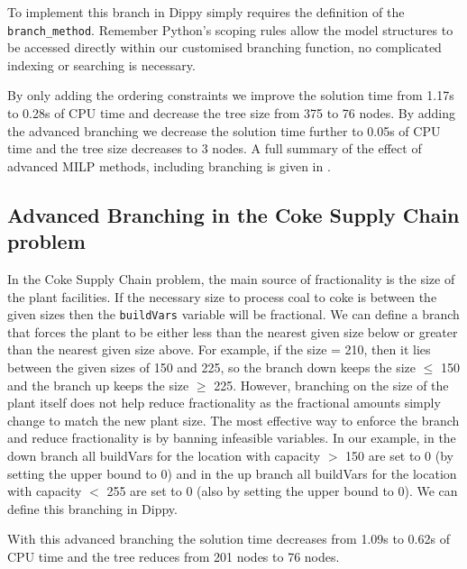 To implement this branch in Dippy simply requires the definition of the \\ \texttt{branch\_method}. Remember Python's scoping rules allow the model structures to be accessed directly within our customised branching function, no complicated indexing or searching is necessary.


By only adding the ordering constraints we improve the solution time from 1.17s to 0.28s of CPU time and decrease the tree size from 375 to 76 nodes. By adding the advanced branching we decrease the solution time further to 0.05s of CPU time and the tree size decreases to 3 nodes. A full summary of the effect of advanced \ac{MILP} methods, including branching is given in .

\subsection{Advanced Branching in the Coke Supply Chain problem}

In the Coke Supply Chain problem, the main source of fractionality is the size of the plant facilities. If the necessary size to process coal to coke is between the given sizes then the \texttt{buildVars} variable will be fractional. We can define a branch that forces the plant to be either less than the nearest given size below or greater than the nearest given size above. For example, if the size = 210, then it lies between the given sizes of 150 and 225, so the branch down keeps the size $\leq$ 150 and the branch up keeps the size $\geq$ 225. However, branching on the size of the plant itself does not help reduce fractionality as the fractional amounts simply change to match the new plant size. The most effective way to enforce the branch and reduce fractionality is by banning infeasible variables. In our example, in the down branch all buildVars for the location with capacity $>$ 150 are set to 0 (by setting the upper bound to 0) and in the up branch all buildVars for the location with capacity $<$ 255 are set to 0 (also by setting the upper bound to 0). We can define this branching in Dippy.


With this advanced branching the solution time decreases from 1.09s to 0.62s of CPU time and the tree reduces from 201 nodes to 76 nodes.

